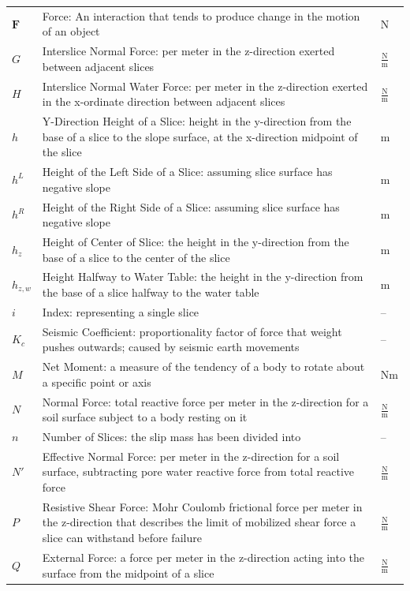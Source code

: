 \documentclass[12pt]{article}
\begin{document}
\begin{longtabu}{l X[l] l}
\\
$\mathbf{F}$ & Force: An interaction that tends to produce change in the motion of an object & N
\\
$G$ & Interslice Normal Force: per meter in the z-direction exerted between adjacent slices & $\frac{\text{N}}{\text{m}}$
\\
$H$ & Interslice Normal Water Force: per meter in the z-direction exerted in the x-ordinate direction between adjacent slices & $\frac{\text{N}}{\text{m}}$
\\
$h$ & Y-Direction Height of a Slice: height in the y-direction from the base of a slice to the slope surface, at the x-direction midpoint of the slice & m
\\
${h^{L}}$ & Height of the Left Side of a Slice: assuming slice surface has negative slope & m
\\
${h^{R}}$ & Height of the Right Side of a Slice: assuming slice surface has negative slope & m
\\
${h_{z}}$ & Height of Center of Slice: the height in the y-direction from the base of a slice to the center of the slice & m
\\
${h_{z,w}}$ & Height Halfway to Water Table: the height in the y-direction from the base of a slice halfway to the water table & m
\\
$i$ & Index: representing a single slice & --
\\
${K_{c}}$ & Seismic Coefficient: proportionality factor of force that weight pushes outwards; caused by seismic earth movements & --
\\
$M$ & Net Moment: a measure of the tendency of a body to rotate about a specific point or axis & Nm
\\
$N$ & Normal Force: total reactive force per meter in the z-direction for a soil surface subject to a body resting on it & $\frac{\text{N}}{\text{m}}$
\\
$n$ & Number of Slices: the slip mass has been divided into & --
\\
$N'$ & Effective Normal Force: per meter in the z-direction for a soil surface, subtracting pore water reactive force from total reactive force & $\frac{\text{N}}{\text{m}}$
\\
$P$ & Resistive Shear Force: Mohr Coulomb frictional force per meter in the z-direction that describes the limit of mobilized shear force a slice can withstand before failure & $\frac{\text{N}}{\text{m}}$
\\
$Q$ & External Force: a force per meter in the z-direction acting into the surface from the midpoint of a slice & $\frac{\text{N}}{\text{m}}$

\end{longtabu}
\end{document}
